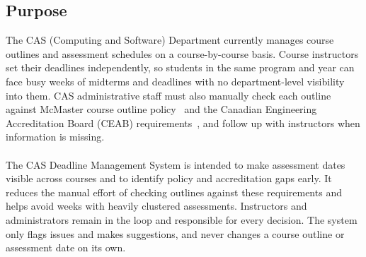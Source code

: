 \documentclass[12pt]{article}
\begin{document}

\subsection{Purpose}

The CAS (Computing and Software) Department currently manages course outlines and assessment schedules on a 
course-by-course basis. Course instructors set their deadlines independently, so students in the same program 
and year can face busy weeks of midterms and deadlines with no department-level visibility into them. 
CAS administrative staff must also manually check each outline against McMaster course outline policy~\citep{McMasterUCMP2025} and 
the Canadian Engineering Accreditation Board (CEAB) requirements~\citep{CEAB2025}, and follow up with instructors when 
information is missing.
\\ \\
The CAS Deadline Management System is intended to make assessment dates visible across courses and to 
identify policy and accreditation gaps early. It reduces the manual effort of checking outlines against 
these requirements and helps avoid weeks with heavily clustered assessments. Instructors and administrators 
remain in the loop and responsible for every decision. The system only flags issues and makes suggestions, 
and never changes a course outline or assessment date on its own.
\end{document}
